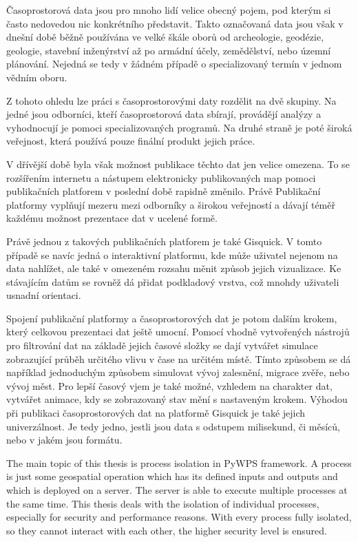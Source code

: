  Časoprostorová data jsou pro mnoho lidí velice obecný pojem, pod kterým si často nedovedou nic konkrétního představit. Takto označovaná data jsou však v dnešní době běžně používána ve velké škále oborů od archeologie, geodézie, geologie, stavební inženýrství až po armádní účely, zemědělství, nebo územní plánování. Nejedná se tedy v žádném případě o specializovaný termín v jednom vědním oboru. 

Z tohoto ohledu lze práci s časoprostorovými daty rozdělit na dvě skupiny. Na jedné jsou odborníci, kteří časoprostorová data sbírají, provádějí analýzy a vyhodnocují je pomoci specializovaných programů. Na druhé straně je poté široká veřejnost, která používá pouze finální produkt jejich práce. 

V dřívější době byla však možnost publikace těchto dat jen velice omezena. To se rozšířením internetu a nástupem elektronicky publikovaných map pomoci publikačních platforem v poslední době rapidně změnilo. Právě Publikační platformy vyplňují mezeru mezi odborníky a širokou veřejností a dávají téměř každému možnost prezentace dat v ucelené formě. 

Právě jednou z takových publikačních platforem je také Gisquick. V tomto případě se navíc jedná o interaktivní platformu, kde může uživatel nejenom na data nahlížet, ale také v omezeném rozsahu měnit způsob jejich vizualizace. Ke stávajícím datům se rovněž dá přidat podkladový vrstva, což mnohdy uživateli usnadní orientaci.

Spojení publikační platformy a časoprostorových dat je potom dalším krokem, který celkovou prezentaci dat ještě umocní. Pomocí vhodně vytvořených nástrojů pro filtrování dat na základě jejich časové složky se dají vytvářet simulace zobrazující průběh určitého vlivu v čase na určitém místě. Tímto způsobem se dá například jednoduchým způsobem simulovat vývoj zalesnění, migrace zvěře, nebo vývoj měst. Pro lepší časový vjem je také možné, vzhledem na charakter dat, vytvářet animace, kdy se zobrazovaný stav mění s nastaveným krokem. 
Výhodou při publikaci časoprostorových dat na platformě Gisquick je také jejich univerzálnost. Je tedy jedno, jestli jsou data s odstupem milisekund, či měsíců, nebo v jakém jsou formátu.  


\bigskip
The main topic of this thesis is process isolation in PyWPS framework. A process is just some geospatial operation which 
has its defined inputs and outputs and which is deployed on a server. The server is able to execute multiple 
processes at the same time. This thesis deals with the isolation of individual processes, especially for security and 
performance reasons. With every process fully isolated, so they cannot interact with each other, the higher security 
level is ensured.

